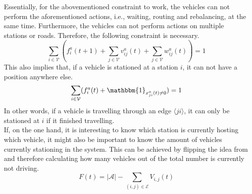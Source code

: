 Essentially, for the abovementioned constraint to work, the vehicles can not perform the aforementioned actions, i.e., waiting, routing and rebalancing, at the same time. Furthermore, the vehicles can not perform actions on multiple stations or roads. Therefore, the following constraint is necessary. \\
\begin{equation}
	\sum_{i \in \mathcal{V}}(f^a_{i}(t+1)+\sum_{j \in \mathcal{V}}v^a_{ij}(t) + \sum_{j \in \mathcal{V}}w^a_{ij}(t)) = 1\label{eq:no_3_actions}
\end{equation}
This also implies that, if a vehicle is stationed at a station $i$, it can not have a position anywhere else. 
\begin{equation}
	\sum_{i \in \mathcal{V}}(f^a_{i}(t)+\mathbbm{1}_{ x^a_{ji}(t)\neq 0}) =1 \label{eq:position_station}
\end{equation}
In other words, if a vehicle is travelling through an edge $\langle ji\rangle$, it can only be stationed at $i$ if it finished travelling. \\
 If, on the one hand, it is interesting to know which station is currently hosting which vehicle, it might also be important to know the amount of vehicles currently stationing in the system. This can be achieved by flipping the idea from  and therefore calculating how many vehicles out of the total number is currently not driving. 
\begin{equation}
	F(t) = |\mathcal{A}| - \sum_{(i,j) \in \mathcal{E}}V_{i,j}(t)%
\end{equation}


